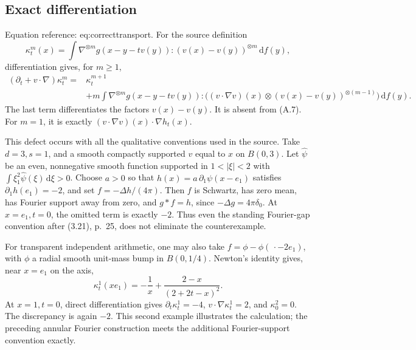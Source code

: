 \documentclass[10pt]{article}
\begin{document}
\subsection*{Exact differentiation}
Equation reference: eq:correcttransport. For the source definition \[\kappa_t^m(x)=\int\nabla^{\otimes m}g(x-y-tv(y)):
                        (v(x)-v(y))^{\otimes m}\,\mathrm df(y),\] differentiation gives, for \(m\geq1\), \[\begin{aligned}

 (\partial_t+v\cdot\nabla)\kappa_t^m
  ={}&\kappa_t^{m+1}\\
 &+m\int\nabla^{\otimes m}g(x-y-tv(y)):
 \bigl((v\cdot\nabla v)(x)\otimes
       (v(x)-v(y))^{\otimes(m-1)}\bigr)\,\mathrm df(y).\nonumber\end{aligned}\] The last term differentiates the factors \(v(x)-v(y)\). It is absent from (A.7). For \(m=1\), it is exactly \((v\cdot\nabla v)(x)\cdot\nabla h_t(x)\).\par
This defect occurs with all the qualitative conventions used in the source. Take \(d=3,s=1\), and a smooth compactly supported \(v\) equal to \(x\) on \(B(0,3)\). Let \(\widehat\psi\) be an even, nonnegative smooth function supported in \(1<|\xi|<2\) with \(\int \xi_1^2\widehat\psi(\xi)\,\mathrm d\xi>0\). Choose \(a>0\) so that \(h(x)=a\,\partial_1\psi(x-e_1)\) satisfies \(\partial_1h(e_1)=-2\), and set \(f=-\Delta h/(4\pi)\). Then \(f\) is Schwartz, has zero mean, has Fourier support away from zero, and \(g*f=h\), since \(-\Delta g=4\pi\delta_0\). At \(x=e_1,t=0\), the omitted term is exactly \(-2\). Thus even the standing Fourier-gap convention after (3.21), p. 25, does not eliminate the counterexample.\par
For transparent independent arithmetic, one may also take \(f=\phi-\phi(\,\cdot-2e_1)\), with \(\phi\) a radial smooth unit-mass bump in \(B(0,1/4)\). Newton’s identity gives, near \(x=e_1\) on the axis, \[\kappa_t^1(xe_1)=-\frac1x+\frac{2-x}{(2+2t-x)^2}.\] At \(x=1,t=0\), direct differentiation gives \(\partial_t\kappa_t^1=-4\), \(v\cdot\nabla\kappa_t^1=2\), and \(\kappa_0^2=0\). The discrepancy is again \(-2\). This second example illustrates the calculation; the preceding annular Fourier construction meets the additional Fourier-support convention exactly.\par
\end{document}
